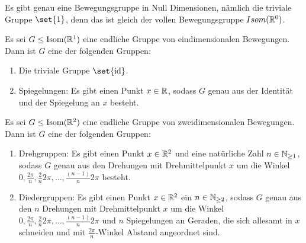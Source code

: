 Es gibt genau eine Bewegungsgruppe in Null Dimensionen, nämlich die triviale Gruppe $\set{1}$, denn das ist gleich der vollen Bewegungsgruppe $Isom(\mathbb{R}^0)$.

\begin{theorem}[Dimension 1]
Es sei $G\leq\operatorname{Isom}(\mathbb{R}^1)$ eine endliche Gruppe von eindimensionalen Bewegungen. Dann ist $G$ eine der folgenden Gruppen:
\begin{enumerate}
\item Die triviale Gruppe $\set{\id}$.
\item Spiegelungen: Es gibt einen Punkt $x\in\mathbb{R}$, sodass $G$ genau aus der Identität und der Spiegelung an $x$ besteht.
\end{enumerate}
\end{theorem}

\begin{theorem}[Dimension 2]
Es sei $G\leq\operatorname{Isom}(\mathbb{R}^2)$ eine endliche Gruppe von zweidimensionalen Bewegungen. Dann ist $G$ eine der folgenden Gruppen:
\begin{enumerate}
\item Drehgruppen: Es gibt einen Punkt $x\in\mathbb{R}^2$ und eine natürliche Zahl $n\in\mathbb{N}_{\geq 1}$, sodass $G$ genau aus den Drehungen mit Drehmittelpunkt $x$ um die Winkel $0,\frac{2\pi}{n}, \frac{2}{n}2\pi, \ldots, \frac{(n-1)}{n}2\pi$ besteht.
\item Diedergruppen: Es gibt einen Punkt $x\in\mathbb{R}^2$ ein $n\in\mathbb{N}_{\geq 2}$, sodass $G$ genau aus den $n$ Drehungen mit Drehmittelpunkt $x$ um die Winkel $0,\frac{2\pi}{n}, \frac{2}{n}2\pi, \ldots, \frac{(n-1)}{n}2\pi$ und $n$ Spiegelungen an Geraden, die sich allesamt in $x$ schneiden und mit $\frac{2\pi}{n}$-Winkel Abstand angeordnet sind.
\end{enumerate}
\end{theorem}

